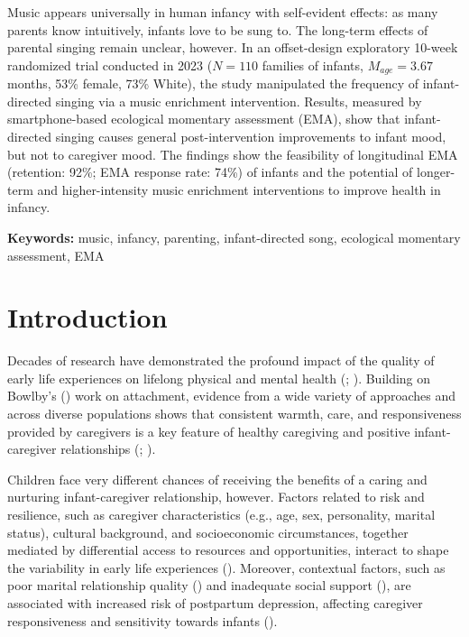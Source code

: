 \documentclass[
]{article}
\begin{document}
\normalsize
\begin{mdframed}[backgroundcolor=gray!20]
Music appears universally in human infancy with self-evident effects: as many parents know intuitively, infants love to be sung to. The long-term effects of parental singing remain unclear, however. In an offset-design exploratory 10-week randomized trial conducted in 2023 ($N = 110$ families of infants, $M_{age} = 3.67$ months, 53\% female, 73\% White), the study manipulated the frequency of infant-directed singing via a music enrichment intervention. Results, measured by smartphone-based ecological momentary assessment (EMA), show that infant-directed singing causes general post-intervention improvements to infant mood, but not to caregiver mood. The findings show the feasibility of longitudinal EMA (retention: 92\%; EMA response rate: 74\%) of infants and the potential of longer-term and higher-intensity music enrichment interventions to improve health in infancy.

\textbf{Keywords:} music, infancy, parenting, infant-directed song, ecological momentary assessment, EMA
\end{mdframed}

\linenumbers
\bigskip

\section{Introduction}\label{introduction}

Decades of research have demonstrated the profound impact of the quality
of early life experiences on lifelong physical and mental health
(;
). Building on
Bowlby's () work on attachment, evidence
from a wide variety of approaches and across diverse populations shows
that consistent warmth, care, and responsiveness provided by caregivers
is a key feature of healthy caregiving and positive infant-caregiver
relationships (;
).

Children face very different chances of receiving the benefits of a
caring and nurturing infant-caregiver relationship, however. Factors
related to risk and resilience, such as caregiver characteristics (e.g.,
age, sex, personality, marital status), cultural background, and
socioeconomic circumstances, together mediated by differential access to
resources and opportunities, interact to shape the variability in early
life experiences ().
Moreover, contextual factors, such as poor marital relationship quality
() and inadequate social
support (), are associated
with increased risk of postpartum depression, affecting caregiver
responsiveness and sensitivity towards infants
().
\end{document}

